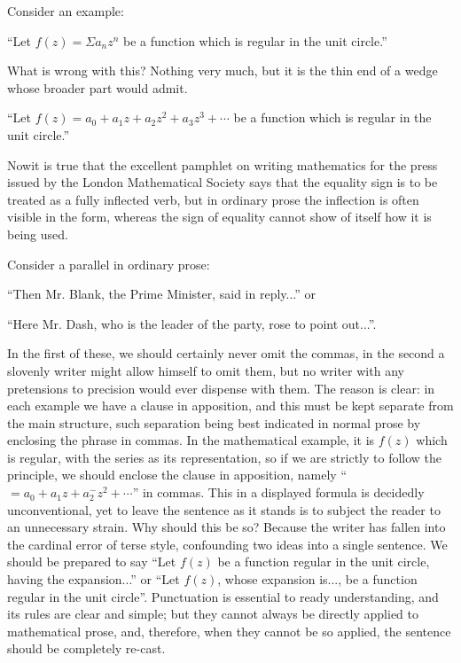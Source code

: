Consider an example:

``Let $f(z)=\Sigma a_{n}z^{n}$ be a function which is regular in the unit circle.''

What is wrong with this? Nothing very much, but it is the thin end of a wedge whose broader part would admit.

``Let $f(z)=a_{0}+a_{1}z+a_{2}z^{2}+a_{3}z^{3}+\cdots$ be a function which is regular in the unit circle.''

Now\pageoriginale it is true that the excellent pamphlet on writing mathematics for the press issued by the London Mathematical Society says that the equality sign is to be treated as a fully inflected verb, but in ordinary prose the inflection is often visible in the form, whereas the sign of equality cannot show of itself how it is being used.

Consider a parallel in ordinary prose:

``Then Mr. Blank, the Prime Minister, said in reply...'' or

``Here Mr. Dash, who is the leader of the party, rose to point out...''.

In the first of these, we should certainly never omit the commas, in the second a slovenly writer might allow himself to omit them, but no writer with any pretensions to precision would ever dispense with them. The reason is clear: in each example we have a clause in apposition, and this must be kept separate from the main structure, such separation being best indicated in normal prose by enclosing the phrase in commas. In the mathematical example, it is $f(z)$ which is regular, with the series as its representation, so if we are strictly to follow the principle, we should enclose the clause in apposition, namely ``$=a_{0}+a_{1}z+a^{-}_{2}z^{2}+\cdots$'' in commas. This in a displayed formula is decidedly unconventional, yet to leave the sentence as it stands is to subject the reader to an unnecessary strain. Why should this be so? Because the writer has fallen into the cardinal error of terse style, confounding two ideas into a single sentence. We should be prepared to say ``Let $f(z)$ be a function regular in the unit circle, having the expansion...'' or ``Let $f(z)$, whose expansion is..., be a function regular in the unit circle''. Punctuation is essential to ready understanding, and its rules are clear and simple; but they cannot always be directly applied to mathematical prose, and, therefore, when they cannot be so applied, the sentence should be completely re-cast.

